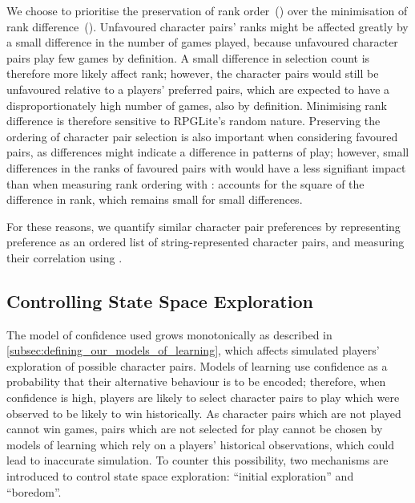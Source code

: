 We choose to prioritise the preservation of rank order~(\tau{}) over the
minimisation of rank difference~(\rho{}). Unfavoured character pairs' ranks
might be affected greatly by a small difference in the number of games played,
because unfavoured character pairs play few games by definition. A small
difference in selection count is therefore more likely affect rank; however, the
character pairs would still be unfavoured relative to a players' preferred
pairs, which are expected to have a disproportionately high number of games,
also by definition. Minimising rank difference is therefore sensitive to
RPGLite's random nature. Preserving the ordering of character pair selection is
also important when considering favoured pairs, as differences might indicate a
difference in patterns of play; however, small differences in the ranks of
favoured pairs with \rho{} would have a less signifiant impact than when
measuring rank ordering with \tau{}: \rho{} accounts for the square of the
difference in rank, which remains small for small differences.

For these reasons, we quantify similar character pair preferences by
representing preference as an ordered list of string-represented character
pairs, and measuring their correlation using \tau{}. 



\subsection{Controlling State Space Exploration}
\label{subsec:controlling_state_space_exploration}

The model of confidence used grows monotonically as described in
\cref{subsec:defining_our_models_of_learning}, which affects simulated players'
exploration of possible character pairs. Models of learning use confidence as a
probability that their alternative behaviour is to be encoded; therefore, when
confidence is high, players are likely to select character pairs to play which
were observed to be likely to win historically. As character pairs which are not
played cannot win games, pairs which are not selected for play cannot be chosen
by models of learning which rely on a players' historical observations, which
could lead to inaccurate simulation. To counter this possibility, two mechanisms
are introduced to control state space exploration: ``initial exploration'' and
``boredom''.

